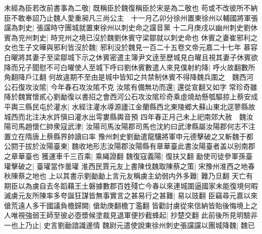 未經為臣若改前書事為二敬|{
	既稱臣於魏復稱臣於宋是為二敬也}
苟或不改彼所不納臣不敢奉詔乃止魏人愛重昶凡三尚公主　十一月乙卯分徐州置東徐州以輔國將軍張讜為刺史|{
	張讜時守團城就置東徐州以刺史命之讜音黨}
十二月庚戌以幽州刺史劉休賓為兖州刺史|{
	時兖州之境已沒於魏劉休賓守梁鄒就以刺史命也}
休賓之妻崔邪利之女也生子文曄與邪利皆沒於魏|{
	邪利没於魏見一百二十五卷文帝元嘉二十七年}
慕容白曜將其妻子至梁鄒城下示之休賓密遣主簿尹文逹至歷城見白曜且視其妻子休賓欲降而兄子聞慰不可白曜使人至城下呼曰劉休賓數遣人來見僕射約降|{
	呼火故翻數所角翻降戶江翻}
何故違期不至由是城中皆知之共禁制休賓不得降魏兵圍之　魏西河公石復攻汝隂|{
	今年春石攻汝隂不克}
汝隂有備無功而還|{
	還從宣翻又如字}
常珍奇雖降於魏實懷貳心劉勔復以書招之會西河公石攻汝隂珍奇乘虛燒劫懸瓠驅掠上蔡安成平輿三縣民屯於灌水|{
	水經注灌水導源廬江金蘭縣西北東陵郷大蘇山東北逕蓼縣故城西而北注决水許愼曰灌水出雩婁縣輿音預}
四年春正月己未上祀南郊大赦　魏汝陽司馬趙懷仁帥衆寇武津|{
	汝陽司馬汝陽郡司馬也沈約曰武津縣屬汝陽郡何志不注置立在隋唐上蔡縣界帥讀曰率}
豫州刺史劉勔遣龍驤將軍申元德擊破之又斬魏于都公閼于拔於汝陽臺東|{
	魏收地形志汝陽郡汝陽縣有章華臺此書汝陽臺者盖以别南郡之章華臺也}
獲運車千三百乘|{
	乘䋲證翻}
魏復寇義陽|{
	復扶又翻}
勔使司徒參軍孫臺瓘擊破之|{
	臺瓘當作曇瓘}
淮西民賈元友上書陳伐魏取陳蔡之策|{
	宋豫州淮西之地春秋陳蔡之地也}
上以其書示劉勔勔上言元友稱虜主幼弱内外多難|{
	難乃旦翻}
天亡有期臣以為虜自去冬蹈藉王土磐據數郡百姓殘亡今春以來連城圍逼國家未能復境何暇滅虜元友所陳率多夸誕狂謀皆無事實言之甚易行之甚難|{
	易以豉翻}
臣竊尋元嘉以來傖荒遠人多干國議負檐歸闕|{
	傖助庚翻檐丁濫翻}
皆勸討虜從來信納皆貽後悔境上之人唯視強弱王師至彼必壺漿候塗裁見退軍便抄截蜂起|{
	抄楚交翻}
此前後所見明驗非一也上乃止|{
	史言劉勔諳識邊情}
魏尉元遣使說東徐州刺史張讜讜以團城降魏|{
	魏已}


